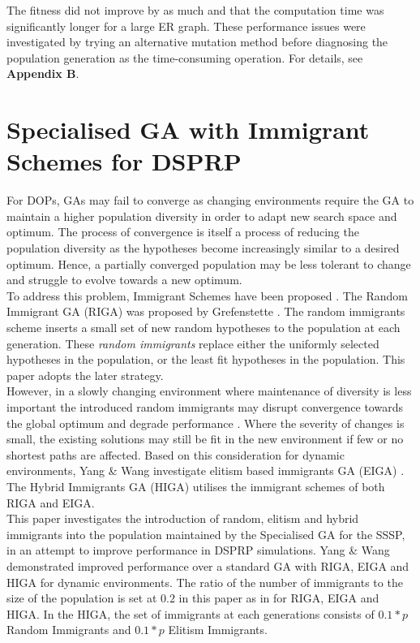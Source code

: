\documentclass[
	a4paper, %
	10pt, %
	unnumberedsections, %
	twoside, %
]{LTJournalArticle}
\begin{document}
The fitness did not improve by as much and that the computation time was significantly longer for a large ER graph. These performance issues were investigated by trying an alternative mutation method before diagnosing the population generation as the time-consuming operation. For details, see \textbf{Appendix B}. 

\section{Specialised GA with Immigrant Schemes for DSPRP} 

For DOPs, GAs may fail to converge as changing environments require the GA to maintain a higher population diversity in order to adapt new search space and optimum. The process of convergence is itself a process of reducing the population diversity as the hypotheses become increasingly similar to a desired optimum. Hence, a partially converged population may be less tolerant to change and struggle to evolve towards a new optimum. \\

To address this problem, Immigrant Schemes have been proposed \cite{yang:10}. The Random Immigrant GA (RIGA) was proposed by Grefenstette \cite{}. The random immigrants scheme inserts a small set of new random hypotheses to the population at each generation. These \emph{random immigrants} replace either the uniformly selected hypotheses in the population, or the least fit hypotheses in the population. This paper adopts the later strategy.  \\

However, in a slowly changing environment where maintenance of diversity is less important the introduced random immigrants may disrupt convergence towards the global optimum and degrade performance \cite{yang:10}. Where the severity of changes is small, the existing solutions may still be fit in the new environment if few or no shortest paths are affected. Based on this consideration for dynamic environments, Yang \& Wang investigate elitism based immigrants GA (EIGA) \cite{yang:10}. The Hybrid Immigrants GA (HIGA) utilises the immigrant schemes of both RIGA and EIGA. \\

This paper investigates the introduction of random, elitism and hybrid immigrants into the population maintained by the Specialised GA for the SSSP, in an attempt to improve performance in DSPRP simulations. Yang \& Wang demonstrated improved performance over a standard GA with RIGA, EIGA and HIGA for dynamic environments. The ratio of the number of immigrants to the size of the population is set at \(0.2\) in this paper as in \cite{yang:10} for RIGA, EIGA and HIGA. In the HIGA, the set of immigrants at each generations consists of \(0.1 * p\) Random Immigrants and \(0.1 * p\) Elitism Immigrants. \\
\end{document}
